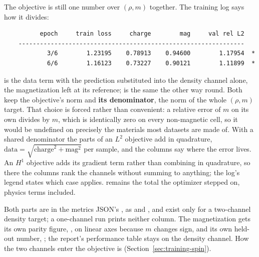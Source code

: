 The objective is still one number over $(\rho, m)$ together. The training log says how it divides:

\begin{lstlisting}
          epoch     train loss     charge        mag     val rel L2
    ---------------------------------------------------------------
            3/6        1.23195    0.78913    0.94600        1.17954  *
            6/6        1.16123    0.73227    0.90121        1.11899  *
\end{lstlisting}

 is the data term with the prediction substituted into the density channel alone, the magnetization left at its reference;  is the same the other way round. Both keep the objective's norm and \textbf{its denominator}, the norm of the whole $(\rho, m)$ target. That choice is forced rather than convenient: a relative error of $m$ on its own divides by $m$, which is identically zero on every non-magnetic cell, so it would be undefined on precisely the materials most datasets are made of. With a shared denominator the parts of an $L^2$ objective add in quadrature, $\text{data} = \sqrt{\text{charge}^2 + \text{mag}^2}$ per sample, and the columns say where the error lives. An $H^1$ objective adds its gradient term rather than combining in quadrature, so there the columns rank the channels without summing to anything; the log's legend states which case applies.  remains the total the optimizer stepped on, physics terms included.

Both parts are in the metrics JSON's , as  and , and exist only for a two-channel density target; a one-channel run prints neither column. The magnetization gets its own parity figure, , on linear axes because $m$ changes sign, and its own held-out number, ; the report's performance table stays on the density channel. How the two channels enter the objective is  (Section~\ref{sec:training-spin}).

\subsection{}

\label{sec:cachememory}


